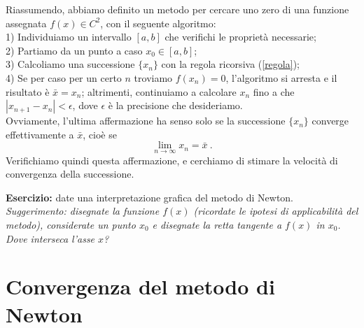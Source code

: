 \documentclass[pre,aps,12pt]{revtex4}
\newcommand{\beq}{\begin{equation}}
\newcommand{\eeq}{\end{equation}}
\newcommand{\spazio}{\vspace{.5cm}}
\begin{document}
\spazio

Riassumendo, abbiamo definito un metodo per cercare uno zero di una funzione
assegnata $f(x) \in C^2$, con il seguente algoritmo: \\
1) Individuiamo un intervallo $[a,b]$ che verifichi le propriet\`a necessarie; \\
2) Partiamo da un punto a caso $x_0 \in [a,b]$; \\
3) Calcoliamo una successione $\{x_n\}$ con la regola ricorsiva (\ref{regola}); \\
4) Se per caso per un certo $n$ troviamo $f(x_n)=0$, l'algoritmo si arresta e il risultato \`e $\bar{x}=x_n$; altrimenti, continuiamo a calcolare $x_n$ fino a
che $|x_{n+1} - x_n | < \epsilon$, dove $\epsilon$ \`e la precisione che
desideriamo. \\
Ovviamente, l'ultima affermazione ha senso solo se la successione $\{x_n\}$
converge effettivamente a $\bar{x}$, cio\`e se
\beq
\lim_{n \rightarrow \infty} x_n = \bar{x} \ .
\eeq
Verifichiamo quindi questa affermazione, e cerchiamo di stimare la velocit\`a
di convergenza della successione.

\spazio

{\bf Esercizio:} date una interpretazione grafica del metodo di Newton. \\
{\it Suggerimento: disegnate la funzione $f(x)$ (ricordate le ipotesi
di applicabilit\`a del metodo), considerate un punto $x_0$
e disegnate la retta tangente a $f(x)$ in $x_0$. Dove interseca l'asse $x$?}




\newpage

\section{Convergenza del metodo di Newton}
\end{document}
